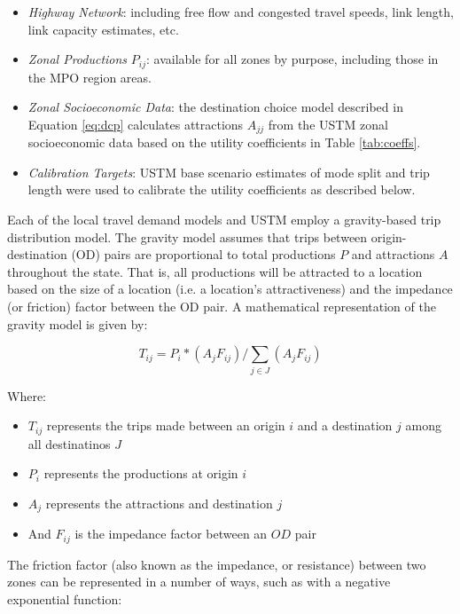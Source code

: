 \begin{itemize}
\def\labelenumi{\arabic{enumi}.}
\item
  \emph{Highway Network}: including free flow and congested travel speeds,
  link length, link capacity estimates, etc.
\item
  \emph{Zonal Productions} \(P_{ij}\): available for all zones by purpose,
  including those in the MPO region areas.
\item
  \emph{Zonal Socioeconomic Data}: the destination choice model described in
  Equation \eqref{eq:dcp} calculates attractions \(A_{jj}\) from the USTM zonal
  socioeconomic data based on the utility coefficients in Table \ref{tab:coeffs}.
\item
  \emph{Calibration Targets}: USTM base scenario estimates of mode split and
  trip length were used to calibrate the utility coefficients as described
  below.
\end{itemize}

Each of the local travel demand models and USTM employ a gravity-based trip
distribution model. The gravity model assumes that trips between origin-
destination (OD) pairs are proportional to total productions $P$ and
attractions $A$ throughout the state. That is, all productions will be
attracted to a location based on the size of a location (i.e. a location's
attractiveness) and the impedance (or friction) factor between the OD
pair. A mathematical representation of the gravity model is given by:

\begin{equation}
T_{ij}= P_i*(A_j F_{ij})/\sum_{j\in J}(A_j F_{ij})
 \label{eqn:gravity}
\end{equation}

\noindent Where:
\begin{itemize}
	\item $T_{ij}$ represents the trips made between an origin $i$ and a
  destination $j$ among all destinatinos $J$
	\item $P_i$ represents the productions at origin $i$
	\item $A_j$ represents the attractions and destination $j$
	\item And $F_{ij}$ is the impedance factor between an $OD$ pair
\end{itemize}

The friction factor (also known as the impedance, or resistance) between two
zones can be represented in a number of ways, such as with a negative
exponential function:

